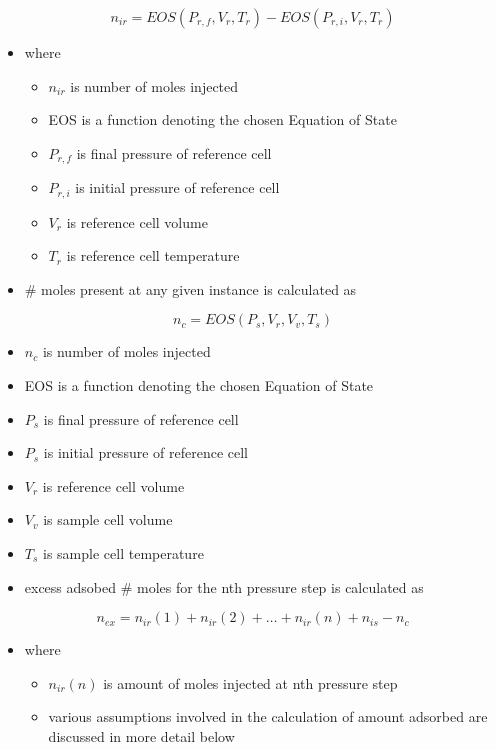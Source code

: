 \documentclass[11pt]{article}
\begin{document}
\begin{equation}
n_{ir} = EOS(P_{r,f},V_r,T_r) - EOS(P_{r,i},V_r,T_r)
\end{equation}
\begin{itemize}
\item where
\begin{itemize}
\item \(n_{ir}\) is number of moles injected
\item EOS is a function denoting the chosen Equation of State
\item \(P_{r,f}\) is final pressure of reference cell
\item \(P_{r,i}\) is initial pressure of reference cell
\item \(V_r\) is reference cell volume
\item \(T_r\) is reference cell temperature
\end{itemize}
\item \# moles present at any given instance is calculated as
\end{itemize}
\begin{equation}
n_{c} = EOS(P_s,V_r,V_v,T_s)
\end{equation}
\begin{itemize}
\item \(n_{c}\) is number of moles injected
\item EOS is a function denoting the chosen Equation of State
\item \(P_{s}\) is final pressure of reference cell
\item \(P_{s}\) is initial pressure of reference cell
\item \(V_r\) is reference cell volume
\item \(V_v\) is sample cell volume
\item \(T_s\) is sample cell temperature
\end{itemize}
\begin{itemize}
\item excess adsobed \# moles for the nth pressure step is calculated as
\end{itemize}
\begin{equation}
n_{ex} = n_{ir}(1) + n_{ir}(2) + \dots + n_{ir}(n) + n_{is} - n_c
\end{equation}
\begin{itemize}
\item where
\begin{itemize}
\item \(n_{ir}(n)\) is amount of moles injected at nth pressure step
\item various assumptions involved in the calculation of amount adsorbed are discussed in more detail below
\end{itemize}
\end{itemize}
\end{document}
